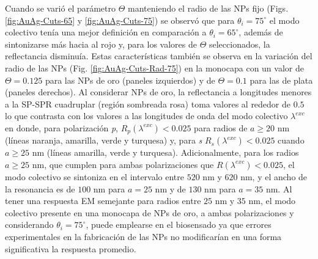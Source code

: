 Cuando se varió el parámetro $\Theta$ manteniendo el radio de las NPs fijo (Figs. \ref{fig:AuAg-Cuts-65} y \ref{fig:AuAg-Cuts-75}) se observó que para $\theta_i=75^\circ$  el modo colectivo tenía una mejor definición en comparación a $\theta_i =65^\circ$, además de sintonizarse más hacia al rojo y, para los valores de $\Theta$ seleccionados, la reflectancia disminuía. Estas características también se observa en la variación del radio de las NPs (Fig. \ref{fig:AuAg-Cuts-Rad-75}) en la monocapa con un valor de $\Theta=0.125$ para las NPs de oro (paneles izquierdos) y de $\Theta=0.1$ para las de plata (paneles derechos). Al considerar NPs de oro, la reflectancia a longitudes menores a la SP-SPR cuadruplar (región sombreada rosa) toma valores al rededor de $0.5$  lo que contrasta con los valores a las longitudes de onda del modo colectivo $\lambda^{exc}$ en donde, para polarización \emph{p}, $R_p(\lambda^{exc})<0.025$ para radios de $a\geq 20$ nm (líneas naranja, amarilla, verde y turquesa) y, para \emph{s} $R_s(\lambda^{exc})<0.025$ cuando $a\geq 25$ nm (líneas amarilla, verde y turquesa). Adicionalmente, para los radios  $a\geq 25$ nm, que cumplen para ambas polarizaciones que $R(\lambda^{exc})<0.025$, el modo colectivo se sintoniza en el intervalo entre $520$ nm y $620$ nm, y el ancho de la resonancia es de $100$ nm para $a=25$ nm y de $130$ nm para $a=35$ nm. Al tener una respuesta EM semejante para radios entre $25$ nm y $35$ nm, el modo colectivo presente en una monocapa de NPs de oro, a ambas polarizaciones y considerando $\theta_i=75^\circ$, puede emplearse en el biosensado ya que errores experimentales en la fabricación de las NPs no modificarían en una forma significativa la respuesta promedio.


